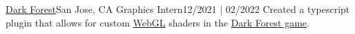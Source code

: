 \resumeSubheading
{\href{https://zkga.me}{Dark Forest}}{San Jose, CA}
{Graphics Intern}{12/2021 | 02/2022}
\resumeItemListStart
{}
{Created a typescript plugin that allows for custom \href{https://developer.mozilla.org/en-US/docs/Web/API/WebGL_API}{WebGL} shaders in the \href{https://zkga.me/}{Dark Forest game}.}
\resumeItemListEnd
